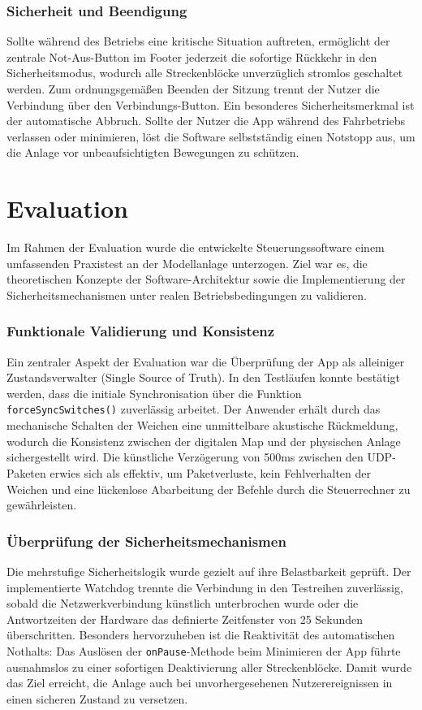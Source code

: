 \documentclass{article}
\begin{document}
\subsubsection{Sicherheit und Beendigung}
Sollte während des Betriebs eine kritische Situation auftreten, ermöglicht der zentrale Not-Aus-Button im Footer jederzeit die sofortige Rückkehr in den Sicherheitsmodus, wodurch alle Streckenblöcke unverzüglich stromlos geschaltet werden. Zum ordnungsgemäßen Beenden der Sitzung trennt der Nutzer die Verbindung über den Verbindungs-Button. Ein besonderes Sicherheitsmerkmal ist der automatische Abbruch. Sollte der Nutzer die App während des Fahrbetriebs verlassen oder minimieren, löst die Software selbstständig einen Notstopp aus, um die Anlage vor unbeaufsichtigten Bewegungen zu schützen.


\section{Evaluation}
Im Rahmen der Evaluation wurde die entwickelte Steuerungssoftware einem umfassenden Praxistest an der Modellanlage unterzogen. Ziel war es, die theoretischen Konzepte der Software-Architektur sowie die Implementierung der Sicherheitsmechanismen unter realen Betriebsbedingungen zu validieren.

\subsubsection{Funktionale Validierung und Konsistenz}
Ein zentraler Aspekt der Evaluation war die Überprüfung der App als alleiniger Zustandsverwalter (Single Source of Truth). In den Testläufen konnte bestätigt werden, dass die initiale Synchronisation über die Funktion \texttt{forceSyncSwitches()} zuverlässig arbeitet. Der Anwender erhält durch das mechanische Schalten der Weichen eine unmittelbare akustische Rückmeldung, wodurch die Konsistenz zwischen der digitalen Map und der physischen Anlage sichergestellt wird. Die künstliche Verzögerung von 500ms zwischen den UDP-Paketen erwies sich als effektiv, um Paketverluste, kein Fehlverhalten der Weichen und eine lückenlose Abarbeitung der Befehle durch die Steuerrechner zu gewährleisten.

\subsubsection{Überprüfung der Sicherheitsmechanismen}
Die mehrstufige Sicherheitslogik wurde gezielt auf ihre Belastbarkeit geprüft. Der implementierte Watchdog trennte die Verbindung in den Testreihen zuverlässig, sobald die Netzwerkverbindung künstlich unterbrochen wurde oder die Antwortzeiten der Hardware das definierte Zeitfenster von 25 Sekunden überschritten. Besonders hervorzuheben ist die Reaktivität des automatischen Nothalts: Das Auslösen der \texttt{onPause}-Methode beim Minimieren der App führte ausnahmslos zu einer sofortigen Deaktivierung aller Streckenblöcke. Damit wurde das Ziel erreicht, die Anlage auch bei unvorhergesehenen Nutzerereignissen in einen sicheren Zustand zu versetzen.
\end{document}

